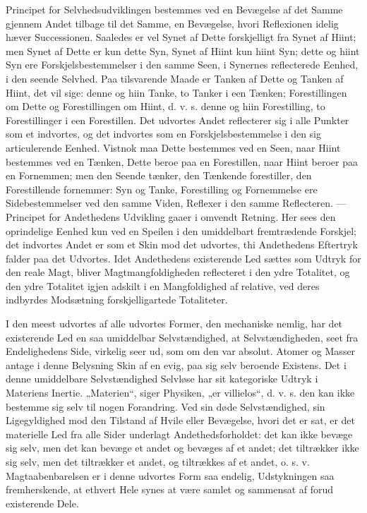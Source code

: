 \documentclass[11pt]{book}
\newcommand{\opage}[1]{\marginnote{\footnotesize\textit{[#1]}}}
\begin{document}
Principet for Selvhedsudviklingen bestemmes ved en Bevægelse af det Samme
gjennem Andet tilbage til det Samme, en Bevægelse, hvori Reflexionen idelig
hæver Successionen. Saaledes er vel Synet af Dette forskjelligt fra Synet af
Hiint; men Synet af Dette er kun dette Syn, Synet af Hiint kun hiint Syn;
dette og hiint Syn ere Forskjelsbestemmelser i den samme Seen, i Synernes
reflecterede Eenhed, i den seende Selvhed. Paa tilsvarende Maade er Tanken af
Dette og Tanken af Hiint, det vil sige: denne og hiin Tanke, to Tanker i een
Tænken; Forestillingen om Dette og Forestillingen om Hiint, d. v. s. denne og
hiin Forestilling, to Forestillinger i een Forestillen. Det udvortes Andet
reflecterer sig i alle Punkter som et indvortes, og det indvortes som en
Forskjelsbestemmelse i den sig articulerende Eenhed. Vistnok maa Dette
bestemmes ved en Seen, naar Hiint bestemmes
\opage{127} \setcounter{footnote}{0}%
ved en Tænken, Dette beroe paa en Forestillen, naar Hiint beroer paa en
Fornemmen; men den Seende tænker, den Tænkende forestiller, den Forestillende
fornemmer: Syn og Tanke, Forestilling og Fornemmelse ere Sidebestemmelser ved
den samme Viden, Reflexer i den samme Reflecteren. --- Principet for
Andethedens Udvikling gaaer i omvendt Retning. Her sees den oprindelige
Eenhed kun ved en Speilen i den umiddelbart fremtrædende Forskjel; det
indvortes Andet er som et Skin mod det udvortes, thi Andethedens Eftertryk
falder paa det Udvortes. Idet Andethedens existerende Led sættes som Udtryk
for den reale Magt, bliver Magtmangfoldigheden reflecteret i den ydre
Totalitet, og den ydre Totalitet igjen adskilt i en Mangfoldighed af relative,
ved deres indbyrdes Modsætning forskjelligartede Totaliteter.

I den meest udvortes af alle udvortes Former, den mechaniske nemlig, har det
existerende Led en saa umiddelbar Selvstændighed, at Selvstændigheden, seet
fra Endelighedens Side, virkelig seer ud, som om den var absolut. Atomer og
Masser antage i denne Belysning Skin af en evig, paa sig selv beroende
Existens. Det i denne umiddelbare Selvstændighed Selvløse har sit kategoriske
Udtryk i Materiens Inertie. „Materien“, siger Physiken, „er villielos“, d. v.
s. den kan ikke bestemme sig selv til nogen Forandring. Ved sin døde
Selvstændighed, sin Ligegyldighed mod den Tilstand af Hvile eller Bevægelse,
hvori det er sat, er det materielle Led fra alle Sider underlagt
Andethedsforholdet: det kan ikke bevæge sig selv, men det kan bevæge et andet
og bevæges af et andet; det tiltrækker ikke sig selv, men det tiltrækker et
andet, og tiltrækkes af et andet, o. s. v. Magtaabenbarelsen er i denne
udvortes Form saa endelig, Udstykningen saa fremherskende, at ethvert Hele
synes at være samlet og sammensat af forud existerende Dele.
\end{document}
